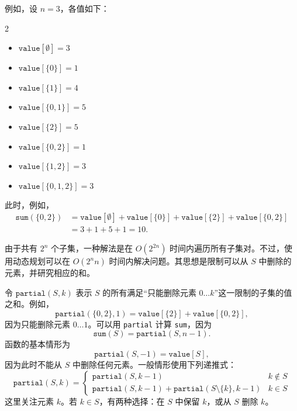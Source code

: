 例如，设 $n=3$，各值如下：
\begin{multicols}{2}
\begin{itemize}
\item $\texttt{value}[\emptyset] = 3$
\item $\texttt{value}[\{0\}] = 1$
\item $\texttt{value}[\{1\}] = 4$
\item $\texttt{value}[\{0,1\}] = 5$
\item $\texttt{value}[\{2\}] = 5$
\item $\texttt{value}[\{0,2\}] = 1$
\item $\texttt{value}[\{1,2\}] = 3$
\item $\texttt{value}[\{0,1,2\}] = 3$
\end{itemize}
\end{multicols}
此时，例如，
\begin{equation*}
\begin{split}
\texttt{sum}(\{0,2\}) &= \texttt{value}[\emptyset]+\texttt{value}[\{0\}]+\texttt{value}[\{2\}]+\texttt{value}[\{0,2\}] \\ 
                      &= 3 + 1 + 5 + 1 = 10.
\end{split}
\end{equation*}

由于共有 $2^n$ 个子集，一种解法是在 $O(2^{2n})$ 时间内遍历所有子集对。不过，使用动态规划可以在 $O(2^nn)$ 时间内解决问题。其思想是限制可以从 $S$ 中删除的元素，并研究相应的和。

令 $\texttt{partial}(S,k)$ 表示 $S$ 的所有满足“只能删除元素 $0\ldots k$”这一限制的子集的值之和。例如，
\[\texttt{partial}(\{0,2\},1)=\texttt{value}[\{2\}]+\texttt{value}[\{0,2\}],\]
因为只能删除元素 $0\ldots1$。可以用 \texttt{partial} 计算 \texttt{sum}，因为
\[\texttt{sum}(S) = \texttt{partial}(S,n-1).\]
函数的基本情形为
\[\texttt{partial}(S,-1)=\texttt{value}[S],\]
因为此时不能从 $S$ 中删除任何元素。一般情形使用下列递推式：
\begin{equation*}
    \texttt{partial}(S,k) = \begin{cases}
               \texttt{partial}(S,k-1) & k \notin S \\
               \texttt{partial}(S,k-1) + \texttt{partial}(S \setminus \{k\},k-1) & k \in S
           \end{cases}
\end{equation*}
这里关注元素 $k$。若 $k\in S$，有两种选择：在 $S$ 中保留 $k$，或从 $S$ 删除 $k$。

